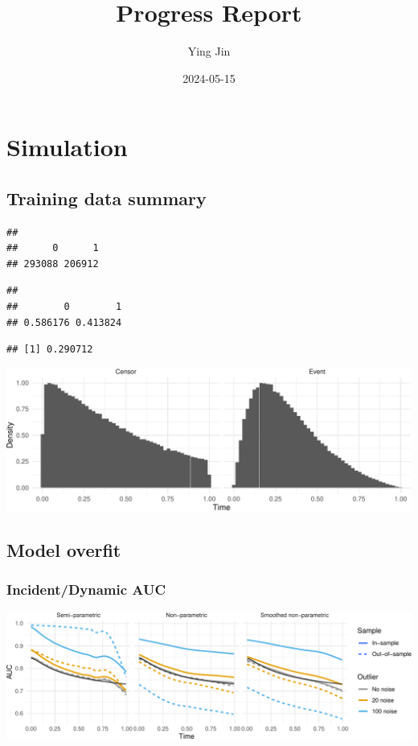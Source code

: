 \documentclass[
]{article}
\title{Progress Report}
\author{Ying Jin}
\date{2024-05-15}
\begin{document}
\maketitle

{
\setcounter{tocdepth}{3}
\tableofcontents
}
\section{Simulation}\label{simulation}

\subsection{Training data summary}\label{training-data-summary}

\begin{verbatim}
## 
##      0      1 
## 293088 206912
\end{verbatim}

\begin{verbatim}
## 
##        0        1 
## 0.586176 0.413824
\end{verbatim}

\begin{verbatim}
## [1] 0.290712
\end{verbatim}

\includegraphics{ProgressReport_files/figure-latex/SimDataDensity-1.pdf}

\subsection{Model overfit}\label{model-overfit}

\subsubsection{Incident/Dynamic AUC}\label{incidentdynamic-auc}

\includegraphics{ProgressReport_files/figure-latex/fig_tv_auc_noise-1.pdf}
\end{document}
